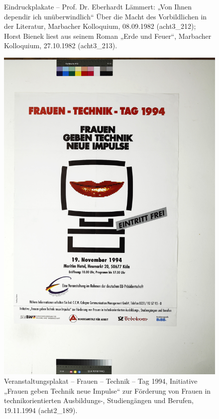 \documentclass[a4paper,12pt,ngerman]{article}
\begin{document}
\begin{landscape}
\begin{figure}[ht]
\begin{subfigure}[b]{0.5\linewidth}
	\end{subfigure}
	\caption{Eindruckplakate – Prof. Dr. Eberhardt Lämmert: „Von Ihnen dependir ich unüberwindlich“ Über die Macht des Vorbildlichen in der Literatur, Marbacher Kolloquium, 08.09.1982 (acht3\_212); Horst Bienek liest aus seinem Roman „Erde und Feuer“, Marbacher Kolloquium, 27.10.1982 (acht3\_213).}
\end{figure}
\end{landscape}

\newpage
\begin{figure}[ht]
\includegraphics[width=\linewidth]{Abbildung_5_(acht2_189)}
\centering
\caption{Veranstaltungsplakat – Frauen – Technik – Tag 1994, Initiative „Frauen geben Technik neue Impulse“ zur Förderung von Frauen in technikorientierten Ausbildungs-, Studiengängen und Berufen, 19.11.1994 (acht2\_189).}
\end{figure}
\end{document}

